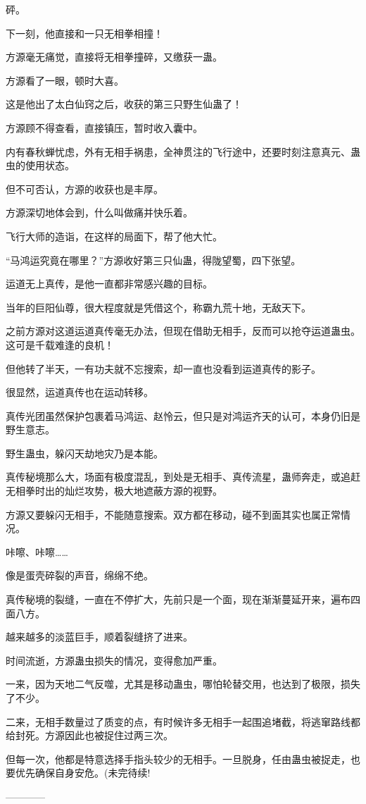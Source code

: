 \begin{this_body}
砰。

下一刻，他直接和一只无相拳相撞！

方源毫无痛觉，直接将无相拳撞碎，又缴获一蛊。

方源看了一眼，顿时大喜。

这是他出了太白仙窍之后，收获的第三只野生仙蛊了！

方源顾不得查看，直接镇压，暂时收入囊中。

内有春秋蝉忧虑，外有无相手祸患，全神贯注的飞行途中，还要时刻注意真元、蛊虫的使用状态。

但不可否认，方源的收获也是丰厚。

方源深切地体会到，什么叫做痛并快乐着。

飞行大师的造诣，在这样的局面下，帮了他大忙。

“马鸿运究竟在哪里？”方源收好第三只仙蛊，得陇望蜀，四下张望。

运道无上真传，是他一直都非常感兴趣的目标。

当年的巨阳仙尊，很大程度就是凭借这个，称霸九荒十地，无敌天下。

之前方源对这道运道真传毫无办法，但现在借助无相手，反而可以抢夺运道蛊虫。这可是千载难逢的良机！

但他转了半天，一有功夫就不忘搜索，却一直也没看到运道真传的影子。

很显然，运道真传也在运动转移。

真传光团虽然保护包裹着马鸿运、赵怜云，但只是对鸿运齐天的认可，本身仍旧是野生意志。

野生蛊虫，躲闪天劫地灾乃是本能。

真传秘境那么大，场面有极度混乱，到处是无相手、真传流星，蛊师奔走，或追赶无相拳时出的灿烂攻势，极大地遮蔽方源的视野。

方源又要躲闪无相手，不能随意搜索。双方都在移动，碰不到面其实也属正常情况。

咔嚓、咔嚓……

像是蛋壳碎裂的声音，绵绵不绝。

真传秘境的裂缝，一直在不停扩大，先前只是一个面，现在渐渐蔓延开来，遍布四面八方。

越来越多的淡蓝巨手，顺着裂缝挤了进来。

时间流逝，方源蛊虫损失的情况，变得愈加严重。

一来，因为天地二气反噬，尤其是移动蛊虫，哪怕轮替交用，也达到了极限，损失了不少。

二来，无相手数量过了质变的点，有时候许多无相手一起围追堵截，将逃窜路线都给封死。方源因此也被捉住过两三次。

但每一次，他都是特意选择手指头较少的无相手。一旦脱身，任由蛊虫被捉走，也要优先确保自身安危。(未完待续!

------------

\end{this_body}

